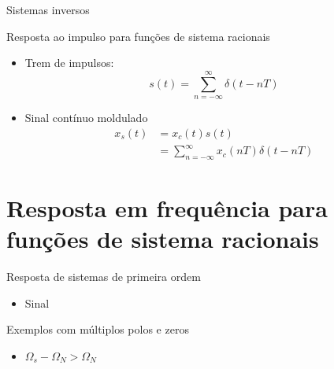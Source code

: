 \begin{slide}{Sistemas inversos}
   \begin{figure}
      \centering
   \end{figure}
\end{slide}

\begin{slide}{Resposta ao impulso para funções de sistema racionais}
\begin{itemize}
   \item Trem de impulsos:
   \begin{equation}
      s(t) = \sum_{n=-\infty}^{\infty}\delta(t-nT)
   \end{equation}
   \item Sinal cont\'inuo moldulado
   \begin{align}
      x_s(t) &= x_c(t)s(t)\\
             &= \sum_{n=-\infty}^{\infty}x_c(nT)\delta(t-nT)
   \end{align}
\end{itemize}
\end{slide}

\section{Resposta em frequência para funções de sistema racionais}
\begin{slide}{Resposta de sistemas de primeira ordem}
\begin{itemize}
   \item Sinal
   \begin{figure}
      \centering
   \end{figure}
\end{itemize}
\end{slide}

\begin{slide}{Exemplos com múltiplos polos e zeros}
\begin{itemize}
   \item $\Omega_s-\Omega_N>\Omega_N$
   \begin{figure}
      \centering
   \end{figure}
\end{itemize}
\end{slide}

